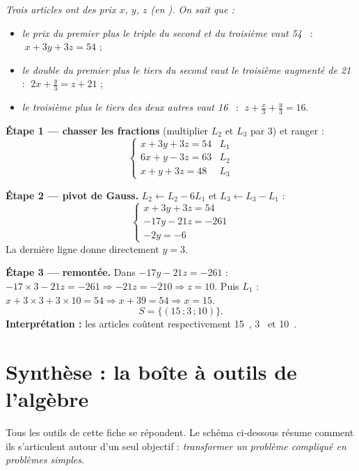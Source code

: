 \documentclass[11pt,a4paper]{article}
\newcommand{\euro}{\texteuro}
\begin{document}
\begin{exemple}
\emph{Trois articles ont des prix $x$, $y$, $z$ (en \euro). On sait que :}
\begin{itemize}[leftmargin=1.6em,topsep=2pt]
  \item \emph{le prix du premier plus le triple du second et du troisième vaut \num{54}~\euro} : $\;x+3y+3z=54$ ;
  \item \emph{le double du premier plus le tiers du second vaut le troisième augmenté de \num{21}~\euro} : $\;2x+\tfrac{y}{3}=z+21$ ;
  \item \emph{le troisième plus le tiers des deux autres vaut \num{16}~\euro} : $\;z+\tfrac{x}{3}+\tfrac{y}{3}=16$.
\end{itemize}

\textbf{Étape 1 — chasser les fractions} (multiplier $L_2$ et $L_3$ par $3$) et ranger :
\[ \begin{cases} x+3y+3z=54 & L_1 \\ 6x+y-3z=63 & L_2 \\ x+y+3z=48 & L_3 \end{cases} \]

\textbf{Étape 2 — pivot de Gauss.} $L_2\leftarrow L_2-6L_1$ et $L_3\leftarrow L_3-L_1$ :
\[ \begin{cases} x+3y+3z=54 \\ -17y-21z=-261 \\ -2y=-6 \end{cases} \]
La dernière ligne donne directement $y=3$.

\textbf{Étape 3 — remontée.} Dans $-17y-21z=-261$ : $-17\times3-21z=-261\Rightarrow -21z=-210\Rightarrow z=10$.
Puis $L_1$ : $x+3\times3+3\times10=54\Rightarrow x+39=54\Rightarrow x=15$.
\[ S=\{(15\,;3\,;10)\}. \]
\textbf{Interprétation :} les articles coûtent respectivement \num{15}~\euro, \num{3}~\euro{} et \num{10}~\euro.
\end{exemple}

\section{Synthèse : la boîte à outils de l'algèbre}
Tous les outils de cette fiche se répondent. Le schéma ci-dessous résume comment ils s'articulent
autour d'un seul objectif : \emph{transformer un problème compliqué en problèmes simples}.
\end{document}

